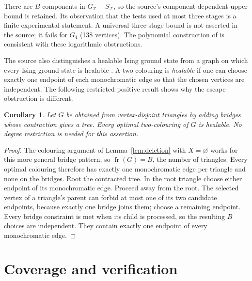 \documentclass[11pt]{article}
\newtheorem{corollary}[theorem]{Corollary}
\newcommand{\fr}{\operatorname{fr}}
\begin{document}
There are $B$ components in $G_{\mathcal T}-S_{\mathcal T}$, so the
source's component-dependent upper bound is retained. Its observation
that the tests used at most three stages is a finite experimental
statement. A universal three-stage bound is not asserted in the source;
it fails for $G_4$ (138 vertices). The polynomial construction of
\cite[Corollary 16]{CYKKW} is consistent with these logarithmic
obstructions.

The source also distinguishes a healable Ising ground state from a
graph on which every Ising ground state is healable
\cite[Section V and Appendix A, ``Strong version'']{CYKKW}.
A two-colouring is \emph{healable} if one can choose exactly one
endpoint of each monochromatic edge so that the chosen vertices are
independent. The following restricted positive result shows why the
escape obstruction is different.

\begin{corollary}\label{cor:healable}
Let $G$ be obtained from vertex-disjoint triangles by adding bridges
whose contraction gives a tree. Every optimal two-colouring of $G$ is
healable. No degree restriction is needed for this assertion.
\end{corollary}
\begin{proof}
The colouring argument of Lemma~\ref{lem:deletion} with $X=\varnothing$
works for this more general bridge pattern, so $\fr(G)=B$, the number
of triangles. Every optimal colouring therefore has exactly one
monochromatic edge per triangle and none on the bridges.
Root the contracted tree. In the root triangle choose either endpoint
of its monochromatic edge. Proceed away from the root. The selected
vertex of a triangle's parent can forbid at most one of its two
candidate endpoints, because exactly one bridge joins them; choose a
remaining endpoint. Every bridge constraint is met when its child is
processed, so the resulting $B$ choices are independent. They contain
exactly one endpoint of every monochromatic edge.
\end{proof}

\section{Coverage and verification}
\end{document}
